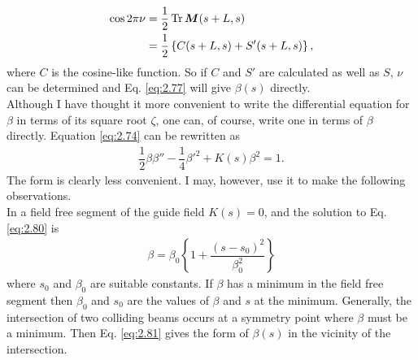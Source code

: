 \begin{align}
	\cos2\pi\nu &= \dfrac{1}{2}\operatorname{Tr}\bm{M}(s+L,s) \\
    	&= \dfrac{1}{2}\left\lbrace C(s+L,s)+S'(s+L,s) \right\rbrace,
\end{align}
where $C$ is the cosine-like function. So if $C$ and $S'$ are calculated as well as $S$, $\nu$ can be determined and Eq. \eqref{eq:2.77} will give $\beta(s)$ directly.\\
Although I have thought it more convenient to write the differential equation for $\beta$ in terms of its square root $\zeta$, one can, of course, write one in terms of $\beta$ directly. Equation \eqref{eq:2.74} can be rewritten as
\begin{align}\label{eq:2.80}
	\dfrac{1}{2}\beta\beta'' - \dfrac{1}{4}\beta'^2 + K(s)\beta^2 = 1.
\end{align}
The form is clearly less convenient. I may, however, use it to make the following observations.\\
In a field free segment of the guide field $K(s) = 0$, and the solution to Eq. \eqref{eq:2.80} is
\begin{align}\label{eq:2.81}
	\beta = \beta_0 \left\lbrace 1 + \dfrac{(s-s_0)^2}{\beta_0^2} \right\rbrace
\end{align}
where $s_0$ and $\beta_0$ are suitable constants. If $\beta$ has a minimum in the field free segment then $\beta_0$ and $s_0$ are the values of $\beta$ and $s$ at the minimum. Generally, the
intersection of two colliding beams occurs at a symmetry point where $\beta$ must be a minimum. Then Eq. \eqref{eq:2.81} gives the form of $\beta(s)$ in the vicinity of the intersection.

